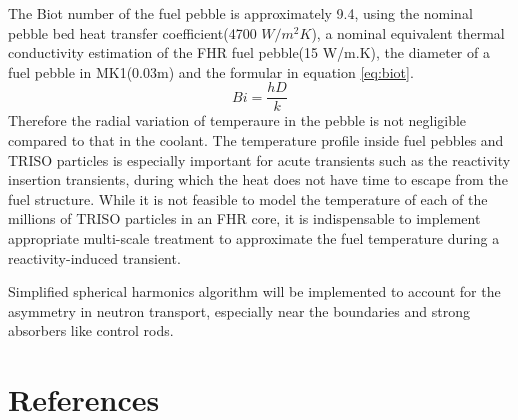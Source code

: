 \documentclass{elsarticle}
\begin{document}
The Biot number of the fuel pebble is approximately 9.4, using the nominal pebble bed heat transfer coefficient(4700 $W/m^2K$), a nominal equivalent thermal conductivity estimation of the FHR fuel pebble(15 W/m.K), the diameter of a fuel pebble in MK1(0.03m) and the formular in equation \ref{eq:biot}.
\begin{equation}
    Bi = \frac{hD}{k}
    \label{eq:biot}
\end{equation}
Therefore the radial variation of temperaure in the pebble is not negligible compared to that in the coolant.
The temperature profile inside fuel pebbles and TRISO particles is especially important for acute transients such as the reactivity insertion transients, during which the heat does not have time to escape from the fuel structure. While it is not feasible to model the temperature of each of the millions of TRISO particles in an FHR core, it is indispensable to implement appropriate multi-scale treatment to approximate the fuel temperature during a reactivity-induced transient.

Simplified spherical harmonics algorithm will be implemented to account for the asymmetry in neutron transport, especially near the boundaries and strong absorbers like control rods.


\section*{References}


\end{document}
